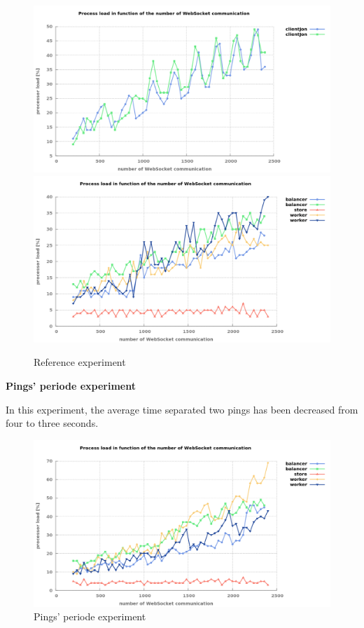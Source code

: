 \begin{figure}[H]
	\centering
		\includegraphics[width=\textwidth]{./Figures/base_client_influence.png}
		\includegraphics[width=\textwidth]{./Figures/base_server_influence.png}
	\caption[Reference experiment]{Reference experiment}
	\label{fig:base_influence}
\end{figure}

\textbf{Pings' periode experiment}

In this experiment, the average time separated two pings has been decreased
from four to three seconds.

\begin{figure}[H]
	\centering
		\includegraphics[width=\textwidth]{./Figures/ping_server_influence.png}
	\caption[Pings' periode experiment]{Pings' periode experiment}
	\label{fig:ping_server_influence}
\end{figure}

